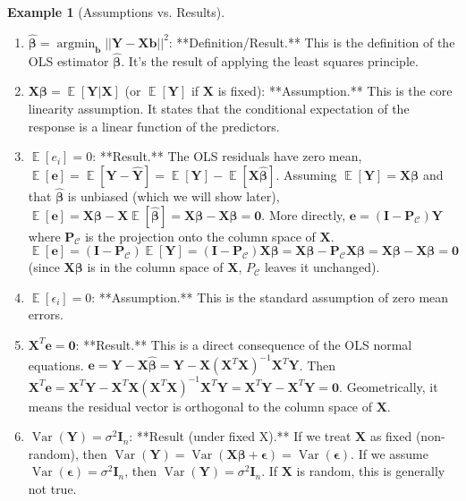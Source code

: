 \documentclass[11pt]{article}
\theoremstyle{definition}
\newtheorem{example}[theorem]{Example}
\theoremstyle{remark}
\DeclareMathOperator{\E}{\mathbb{E}}
\DeclareMathOperator{\Var}{\operatorname{Var}}
\DeclareMathOperator{\argmin}{\operatorname{argmin}}
\begin{document}
\begin{example}[Assumptions vs. Results]
    \begin{enumerate}
        \item $\hat{\bm{\beta}} = \argmin_{\bm{b}} ||\bm{Y} - \bm{X}\bm{b}||^2$: **Definition/Result.** This is the definition of the OLS estimator $\hat{\bm{\beta}}$. It's the result of applying the least squares principle.
        \item $\bm{X}\bm{\beta} = \E[\bm{Y} | \bm{X}]$ (or $\E[\bm{Y}]$ if $\bm{X}$ is fixed): **Assumption.** This is the core linearity assumption. It states that the conditional expectation of the response is a linear function of the predictors.
        \item $\E[e_i] = 0$: **Result.** The OLS residuals have zero mean, $\E[\bm{e}] = \E[\bm{Y} - \hat{\bm{Y}}] = \E[\bm{Y}] - \E[\bm{X}\hat{\bm{\beta}}]$. Assuming $\E[\bm{Y}]=\bm{X}\bm{\beta}$ and that $\hat{\bm{\beta}}$ is unbiased (which we will show later), $\E[\bm{e}] = \bm{X}\bm{\beta} - \bm{X}\E[\hat{\bm{\beta}}] = \bm{X}\bm{\beta} - \bm{X}\bm{\beta} = \mathbf{0}$. More directly, $\bm{e} = (\bm{I}-\bm{P}_{\mathcal{C}})\bm{Y}$ where $\bm{P}_{\mathcal{C}}$ is the projection onto the column space of $\bm{X}$. $\E[\bm{e}] = (\bm{I}-\bm{P}_{\mathcal{C}})\E[\bm{Y}] = (\bm{I}-\bm{P}_{\mathcal{C}})\bm{X}\bm{\beta} = \bm{X}\bm{\beta} - \bm{P}_{\mathcal{C}}\bm{X}\bm{\beta} = \bm{X}\bm{\beta} - \bm{X}\bm{\beta} = \mathbf{0}$ (since $\bm{X}\bm{\beta}$ is in the column space of $\bm{X}$, $P_{\mathcal{C}}$ leaves it unchanged).
        \item $\E[\epsilon_i] = 0$: **Assumption.** This is the standard assumption of zero mean errors.
        \item $\bm{X}^T \bm{e} = \mathbf{0}$: **Result.** This is a direct consequence of the OLS normal equations. $\bm{e} = \bm{Y} - \bm{X}\hat{\bm{\beta}} = \bm{Y} - \bm{X}(\bm{X}^T\bm{X})^{-1}\bm{X}^T\bm{Y}$. Then $\bm{X}^T\bm{e} = \bm{X}^T\bm{Y} - \bm{X}^T\bm{X}(\bm{X}^T\bm{X})^{-1}\bm{X}^T\bm{Y} = \bm{X}^T\bm{Y} - \bm{X}^T\bm{Y} = \mathbf{0}$. Geometrically, it means the residual vector is orthogonal to the column space of $\bm{X}$.
        \item $\Var(\bm{Y}) = \sigma^2 \bm{I}_n$: **Result (under fixed X).** If we treat $\bm{X}$ as fixed (non-random), then $\Var(\bm{Y}) = \Var(\bm{X}\bm{\beta} + \bm{\epsilon}) = \Var(\bm{\epsilon})$. If we assume $\Var(\bm{\epsilon}) = \sigma^2\bm{I}_n$, then $\Var(\bm{Y}) = \sigma^2\bm{I}_n$. If $\bm{X}$ is random, this is generally not true.
    \end{enumerate}
\end{example}
\end{document}
